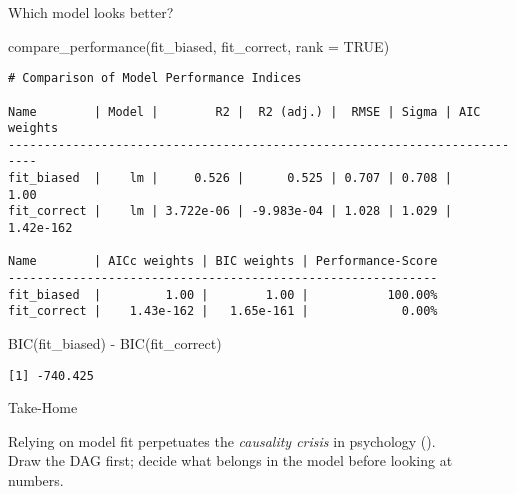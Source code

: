 \documentclass[
  ignorenonframetext,
  aspectratio=169,
  xcolor=\{dvipsnames\}]{beamer}
\newenvironment{Shaded}{\begin{snugshade}}{\end{snugshade}}
\newcommand{\AttributeTok}[1]{\textcolor[rgb]{0.40,0.45,0.13}{#1}}
\newcommand{\ConstantTok}[1]{\textcolor[rgb]{0.56,0.35,0.01}{#1}}
\newcommand{\FunctionTok}[1]{\textcolor[rgb]{0.28,0.35,0.67}{#1}}
\newcommand{\NormalTok}[1]{\textcolor[rgb]{0.00,0.23,0.31}{#1}}
\newcommand{\SpecialCharTok}[1]{\textcolor[rgb]{0.37,0.37,0.37}{#1}}
\begin{document}
\begin{frame}[fragile]{Which model looks better?}
\label{which-model-looks-better-1}
\begin{Shaded}
\begin{Highlighting}[]
\FunctionTok{compare\_performance}\NormalTok{(fit\_biased, fit\_correct, }\AttributeTok{rank =} \ConstantTok{TRUE}\NormalTok{)}
\end{Highlighting}
\end{Shaded}

\begin{verbatim}
# Comparison of Model Performance Indices

Name        | Model |        R2 |  R2 (adj.) |  RMSE | Sigma | AIC weights
--------------------------------------------------------------------------
fit_biased  |    lm |     0.526 |      0.525 | 0.707 | 0.708 |        1.00
fit_correct |    lm | 3.722e-06 | -9.983e-04 | 1.028 | 1.029 |   1.42e-162

Name        | AICc weights | BIC weights | Performance-Score
------------------------------------------------------------
fit_biased  |         1.00 |        1.00 |           100.00%
fit_correct |    1.43e-162 |   1.65e-161 |             0.00%
\end{verbatim}

\begin{Shaded}
\begin{Highlighting}[]
\FunctionTok{BIC}\NormalTok{(fit\_biased) }\SpecialCharTok{{-}} \FunctionTok{BIC}\NormalTok{(fit\_correct)}
\end{Highlighting}
\end{Shaded}

\begin{verbatim}
[1] -740.425
\end{verbatim}
\end{frame}

\begin{frame}{Take-Home}
\label{take-home}
\begin{tcolorbox}[enhanced jigsaw, breakable, opacityback=0, opacitybacktitle=0.6, toprule=.15mm, colbacktitle=quarto-callout-important-color!10!white, colframe=quarto-callout-important-color-frame, bottomtitle=1mm, titlerule=0mm, colback=white, bottomrule=.15mm, arc=.35mm, leftrule=.75mm, coltitle=black, toptitle=1mm, title=\textcolor{quarto-callout-important-color}{\faExclamation}\hspace{0.5em}{Important}, rightrule=.15mm, left=2mm]

Relying on model fit perpetuates the \emph{causality crisis} in
psychology ().\\
Draw the DAG first; decide what belongs in the model before looking at
numbers.

\end{tcolorbox}
\end{frame}
\end{document}
